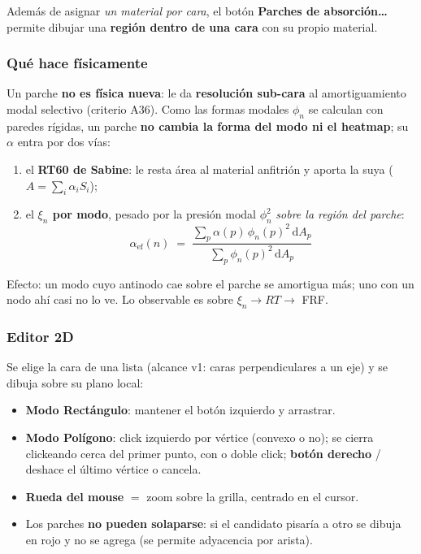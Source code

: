 \documentclass[11pt, a4paper]{article}
\newcommand{\tecla}[1]{\texttt{\small\fbox{#1}}}
\newcommand{\menu}[1]{\textbf{\guillemotleft #1\guillemotright}}
\begin{document}
Además de asignar \emph{un material por cara}, el botón
\menu{Parches de absorción\ldots} permite dibujar una \textbf{región dentro de
una cara} con su propio material.

\subsubsection*{Qué hace físicamente}

Un parche \textbf{no es física nueva}: le da \textbf{resolución sub-cara} al
amortiguamiento modal selectivo (criterio A36). Como las formas modales
$\phi_n$ se calculan con paredes rígidas, un parche \textbf{no cambia la forma
del modo ni el heatmap}; su $\alpha$ entra por dos vías:

\begin{enumerate}
  \item el \textbf{RT60 de Sabine}: le resta área al material anfitrión y
        aporta la suya ($A = \sum_i \alpha_i S_i$);
  \item el \textbf{$\xi_n$ por modo}, pesado por la presión modal $\phi_n^2$
        \emph{sobre la región del parche}:
        \[
          \alpha_{\text{ef}}(n) \;=\;
          \frac{\sum_p \alpha(p)\,\phi_n(p)^2\,\mathrm{d}A_p}
               {\sum_p \phi_n(p)^2\,\mathrm{d}A_p}
        \]
\end{enumerate}

Efecto: un modo cuyo antinodo cae sobre el parche se amortigua más; uno con un
nodo ahí casi no lo ve. Lo observable es sobre $\xi_n \to RT \to$ FRF.

\subsubsection*{Editor 2D}

Se elige la cara de una lista (alcance v1: caras perpendiculares a un eje) y se
dibuja sobre su plano local:

\begin{itemize}
  \item \textbf{Modo Rectángulo}: mantener el botón izquierdo y arrastrar.
  \item \textbf{Modo Polígono}: click izquierdo por vértice (convexo o no); se
        cierra clickeando cerca del primer punto, con \tecla{Enter} o doble
        click; \textbf{botón derecho} / \tecla{Esc} deshace el último vértice o
        cancela.
  \item \textbf{Rueda del mouse} $=$ zoom sobre la grilla, centrado en el cursor.
  \item Los parches \textbf{no pueden solaparse}: si el candidato pisaría a
        otro se dibuja en rojo y no se agrega (se permite adyacencia por arista).
\end{itemize}
\end{document}
